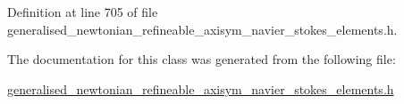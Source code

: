 Definition at line 705 of file generalised\+\_\+newtonian\+\_\+refineable\+\_\+axisym\+\_\+navier\+\_\+stokes\+\_\+elements.\+h.



The documentation for this class was generated from the following file\+:\begin{DoxyCompactItemize}
\item 
\hyperlink{generalised__newtonian__refineable__axisym__navier__stokes__elements_8h}{generalised\+\_\+newtonian\+\_\+refineable\+\_\+axisym\+\_\+navier\+\_\+stokes\+\_\+elements.\+h}\end{DoxyCompactItemize}
